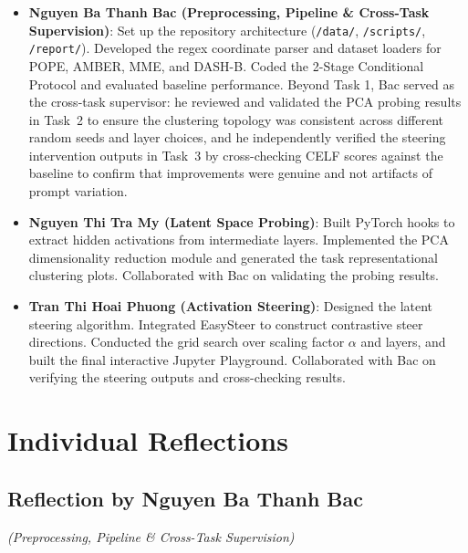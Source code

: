 \documentclass[12pt,a4paper]{article}
\begin{document}
\begin{itemize}[leftmargin=*]
\item \textbf{Nguyen Ba Thanh Bac (Preprocessing, Pipeline \& Cross-Task Supervision)}: Set up the repository architecture (\texttt{/data/}, \texttt{/scripts/}, \texttt{/report/}). Developed the regex coordinate parser and dataset loaders for POPE, AMBER, MME, and DASH-B. Coded the 2-Stage Conditional Protocol and evaluated baseline performance. Beyond Task 1, Bac served as the cross-task supervisor: he reviewed and validated the PCA probing results in Task~2 to ensure the clustering topology was consistent across different random seeds and layer choices, and he independently verified the steering intervention outputs in Task~3 by cross-checking CELF scores against the baseline to confirm that improvements were genuine and not artifacts of prompt variation.

\item \textbf{Nguyen Thi Tra My (Latent Space Probing)}: Built PyTorch hooks to extract hidden activations from intermediate layers. Implemented the PCA dimensionality reduction module and generated the task representational clustering plots. Collaborated with Bac on validating the probing results.

\item \textbf{Tran Thi Hoai Phuong (Activation Steering)}: Designed the latent steering algorithm. Integrated EasySteer to construct contrastive steer directions. Conducted the grid search over scaling factor $\alpha$ and layers, and built the final interactive Jupyter Playground. Collaborated with Bac on verifying the steering outputs and cross-checking results.
\end{itemize}

\section{Individual Reflections}

\subsection{Reflection by Nguyen Ba Thanh Bac}
\textit{(Preprocessing, Pipeline \& Cross-Task Supervision)}
\end{document}
